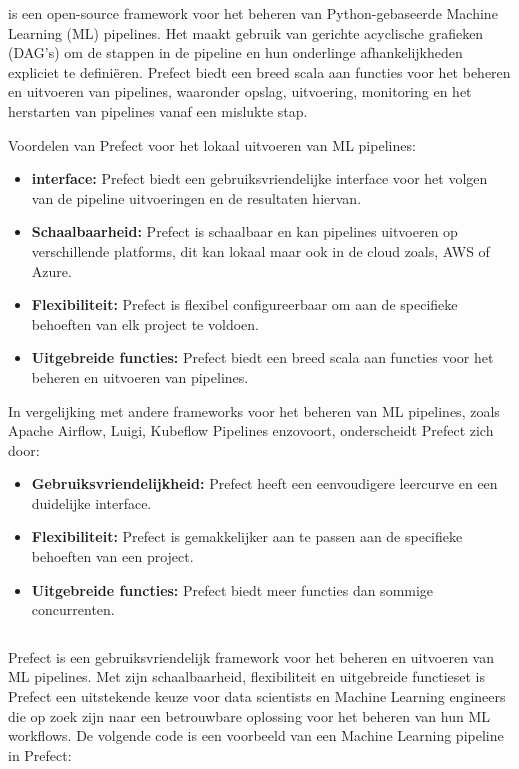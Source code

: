 \textcite{Prefect2024} is een open-source framework voor het beheren van Python-gebaseerde Machine Learning (ML) pipelines. Het maakt gebruik van gerichte acyclische grafieken (DAG's) om de stappen in de pipeline en hun onderlinge afhankelijkheden expliciet te definiëren. Prefect biedt een breed scala aan functies voor het beheren en uitvoeren van pipelines, waaronder opslag, uitvoering, monitoring en het herstarten van pipelines vanaf een mislukte stap.

Voordelen van Prefect voor het lokaal uitvoeren van ML pipelines:

\begin{itemize}
  \item \textbf{interface:} Prefect biedt een gebruiksvriendelijke interface voor het volgen van de pipeline uitvoeringen en de resultaten hiervan.
  \item \textbf{Schaalbaarheid:} Prefect is schaalbaar en kan pipelines uitvoeren op verschillende platforms, dit kan lokaal maar ook in de cloud zoals, AWS of Azure.
  \item \textbf{Flexibiliteit:} Prefect is flexibel configureerbaar om aan de specifieke behoeften van elk project te voldoen.
  \item \textbf{Uitgebreide functies:} Prefect biedt een breed scala aan functies voor het beheren en uitvoeren van pipelines.
\end{itemize}

In vergelijking met andere frameworks voor het beheren van ML pipelines, zoals Apache Airflow, Luigi, Kubeflow Pipelines enzovoort, onderscheidt Prefect zich door:

\begin{itemize}
  \item \textbf{Gebruiksvriendelijkheid:} Prefect heeft een eenvoudigere leercurve en een duidelijke interface.
  \item \textbf{Flexibiliteit:} Prefect is gemakkelijker aan te passen aan de specifieke behoeften van een project.
  \item \textbf{Uitgebreide functies:} Prefect biedt meer functies dan sommige concurrenten.
\end{itemize}
\begin{verbatim}
\end{verbatim}
Prefect is een gebruiksvriendelijk framework voor het beheren en uitvoeren van ML pipelines. Met zijn schaalbaarheid, flexibiliteit en uitgebreide functieset is Prefect een uitstekende keuze voor data scientists en Machine Learning engineers die op zoek zijn naar een betrouwbare oplossing voor het beheren van hun ML workflows.
De volgende code is een voorbeeld van een Machine Learning pipeline in Prefect:

